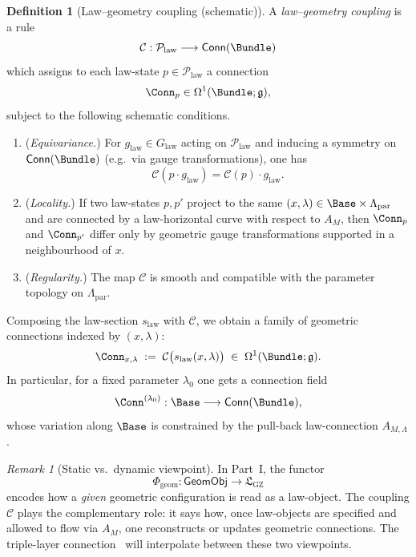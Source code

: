 \documentclass[11pt]{book}
\theoremstyle{plain}
\theoremstyle{definition}
\newtheorem{definition}[theorem]{Definition} \theoremstyle{remark}
\newtheorem{remark}[theorem]{Remark}
\newcommand{\GZLS}{\ensuremath{\mathfrak{L}_{\mathrm{GZ}}}}       \newcommand{\GZLT}{\ensuremath{M_{!w}}}                           \newcommand{\GZLOC}{\ensuremath{A_M}}                             \newcommand{\GZLCurv}{\ensuremath{\mathcal{F}_{\mathrm{law}}}}
\begin{document}
\begin{definition}[Law–geometry coupling (schematic)]
A \emph{law–geometry coupling} is a rule
  \[
     \mathcal{C}:
       \mathcal{P}_{\mathrm{law}}
       \longrightarrow
       \mathsf{Conn}(\Bundle)
  \]
  which assigns to each law-state $p\in\mathcal{P}_{\mathrm{law}}$ a
  connection
  \[
     \Conn_p\in\Omega^1(\Bundle;\mathfrak{g}),
  \]
  subject to the following schematic conditions.
  \begin{enumerate}[label=\roman*)]
    \item (\emph{Equivariance.})
          For $g_{\mathrm{law}}\in G_{\mathrm{law}}$ acting on
          $\mathcal{P}_{\mathrm{law}}$ and inducing a symmetry on
          $\mathsf{Conn}(\Bundle)$ (e.g.\ via gauge transformations),
          one has
          \[
             \mathcal{C}(p\cdot g_{\mathrm{law}})
             = \mathcal{C}(p)\cdot g_{\mathrm{law}}.
          \]
    \item (\emph{Locality.})
          If two law-states $p,p'$ project to the same
          $(x,\lambda)\in\Base\times\Lambda_{\mathrm{par}}$ and are
          connected by a law-horizontal curve with respect to \GZLOC,
          then $\Conn_p$ and $\Conn_{p'}$ differ only by geometric gauge
          transformations supported in a neighbourhood of $x$.
    \item (\emph{Regularity.})
          The map $\mathcal{C}$ is smooth and compatible with the
          parameter topology on $\Lambda_{\mathrm{par}}$.
  \end{enumerate}
\end{definition}

Composing the law-section $s_{\mathrm{law}}$ with $\mathcal{C}$, we
obtain a family of geometric connections indexed by
$(x,\lambda)$:
\[
   \Conn_{x,\lambda}
   \;:=\;
   \mathcal{C}\bigl(s_{\mathrm{law}}(x,\lambda)\bigr)
   \;\in\;
   \Omega^1(\Bundle;\mathfrak{g}).
\]
In particular, for a fixed parameter $\lambda_0$ one gets a connection
field
\[
   \Conn^{(\lambda_0)}:\Base\longrightarrow\mathsf{Conn}(\Bundle),
\]
whose variation along $\Base$ is constrained by the pull-back law-connection
$A_{M,\Lambda}$.



\begin{remark}[Static vs.\ dynamic viewpoint]
In Part~I, the functor
  \[
     \Phi_{\mathrm{geom}}:\mathsf{GeomObj}\longrightarrow\GZLS
  \]
  encodes how a \emph{given} geometric configuration is read as a
  law-object. The coupling $\mathcal{C}$ plays the complementary role:
  it says how, once law-objects are specified and allowed to flow via
  \GZLOC, one reconstructs or updates geometric connections. The
  triple-layer connection \GZTLC\ will interpolate between these two
  viewpoints.
\end{remark}
\end{document}
